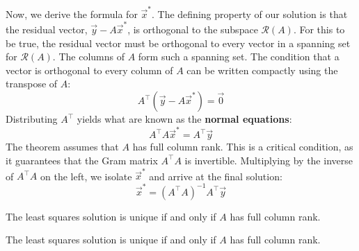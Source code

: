 \documentclass{article}
\begin{document}
\begin{Proof}
\begin{Exposition}
    Now, we derive the formula for $\vec{x}^*$. The defining property of our solution is that the residual vector, $\vec{y} - A\vec{x}^*$, is orthogonal to the subspace $\mathcal{R}(A)$. For this to be true, the residual vector must be orthogonal to every vector in a spanning set for $\mathcal{R}(A)$. The columns of $A$ form such a spanning set. The condition that a vector is orthogonal to every column of $A$ can be written compactly using the transpose of $A$:
    $$ A^\top (\vec{y} - A\vec{x}^*) = \vec{0} $$
    Distributing $A^\top$ yields what are known as the \textbf{normal equations}:
    $$ A^\top A \vec{x}^* = A^\top \vec{y} $$
    The theorem assumes that $A$ has full column rank. This is a critical condition, as it guarantees that the Gram matrix $A^\top A$ is invertible. Multiplying by the inverse of $A^\top A$ on the left, we isolate $\vec{x}^*$ and arrive at the final solution:
    $$ \vec{x}^* = (A^\top A)^{-1} A^\top \vec{y} $$
  \end{Exposition}

  \begin{Exposition}
    The least squares solution is unique if and only if $A$ has full column rank.
  \end{Exposition}

  \begin{Exposition}
    The least squares solution is unique if and only if $A$ has full column rank.
  \end{Exposition}
\end{Proof}
\end{document}
